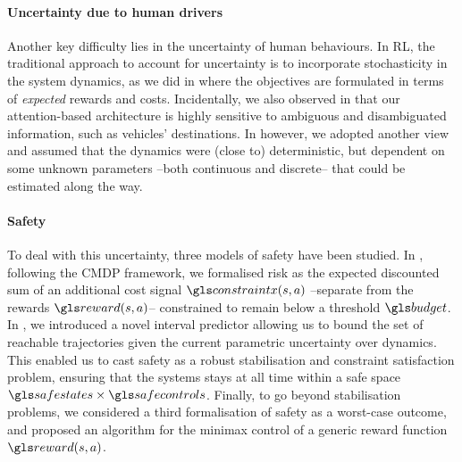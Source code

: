 \paragraph{Uncertainty due to human drivers}
Another key difficulty lies in the uncertainty of human behaviours. In \gls{RL}, the traditional approach to account for uncertainty is to incorporate stochasticity in the system dynamics, as we did in  where the objectives are formulated in terms of \emph{expected} rewards and costs. Incidentally, we also observed in  that our attention-based architecture is highly sensitive to ambiguous and disambiguated information, such as vehicles' destinations. In  however, we adopted another view and assumed that the dynamics were (close to) deterministic, but dependent on some unknown parameters --both continuous and discrete-- that could be estimated along the way.

\paragraph{Safety}
To deal with this uncertainty, three models of safety have been studied. In , following the \gls{CMDP} framework, we formalised risk as the expected discounted sum of an additional cost signal $\constraint(s,a)$ --separate from the rewards $\reward(s,a)$-- constrained to remain below a threshold $\budget$. In , we introduced a novel interval predictor allowing us to bound the set of reachable trajectories given the current parametric uncertainty over dynamics. This enabled us to cast safety as a robust stabilisation and constraint satisfaction problem, ensuring that the systems stays at all time within a safe space $\safestates\times\safecontrols$. Finally, to go beyond stabilisation problems, we considered a third formalisation of safety as a worst-case outcome, and proposed an algorithm for the minimax control of a generic reward function $\R(s,a)$.

